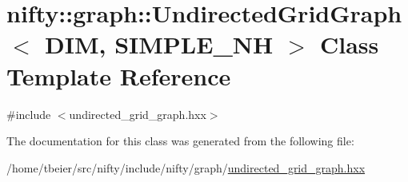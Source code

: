 \hypertarget{classnifty_1_1graph_1_1UndirectedGridGraph}{}\section{nifty\+:\+:graph\+:\+:Undirected\+Grid\+Graph$<$ D\+IM, S\+I\+M\+P\+L\+E\+\_\+\+NH $>$ Class Template Reference}
\label{classnifty_1_1graph_1_1UndirectedGridGraph}


{\ttfamily \#include $<$undirected\+\_\+grid\+\_\+graph.\+hxx$>$}



The documentation for this class was generated from the following file\+:\begin{DoxyCompactItemize}
\item 
/home/tbeier/src/nifty/include/nifty/graph/\hyperlink{graph_2undirected__grid__graph_8hxx}{undirected\+\_\+grid\+\_\+graph.\+hxx}\end{DoxyCompactItemize}

